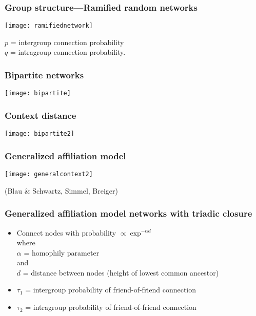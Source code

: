 \begin{frame}
  \frametitle{Group structure---Ramified random networks}
 
   \centering
   \texttt{[image: ramifiednetwork]}
 
   $p$ = intergroup connection probability\\
   $q$ = intragroup connection probability.
 
\end{frame}

\begin{frame}
  \frametitle{Bipartite networks}
 
   \centering
   \texttt{[image: bipartite]}
 
 
 
 
 
\end{frame}

\begin{frame}
  \frametitle{Context distance}
 
   \centering
   \texttt{[image: bipartite2]}
  
\end{frame}

\begin{frame}
  \frametitle{Generalized affiliation model}
 
   \centering
   \texttt{[image: generalcontext2]}
 
   (Blau \& Schwartz, Simmel, Breiger)
 
 
 

\end{frame}

\begin{frame}
  \frametitle{Generalized affiliation model networks with triadic closure}

  \begin{itemize}
  \item<1-> Connect nodes with probability $\propto \exp^{-\alpha d}$\\
  where\\
  $\alpha$ = homophily parameter\\
  and \\
  $d$ = distance between nodes (height of lowest common ancestor)
  \item<2->
  $\tau_1$ = intergroup probability of friend-of-friend connection
  \item<3->
  $\tau_2$ = intragroup probability of friend-of-friend connection
  \end{itemize}
 
\end{frame}

